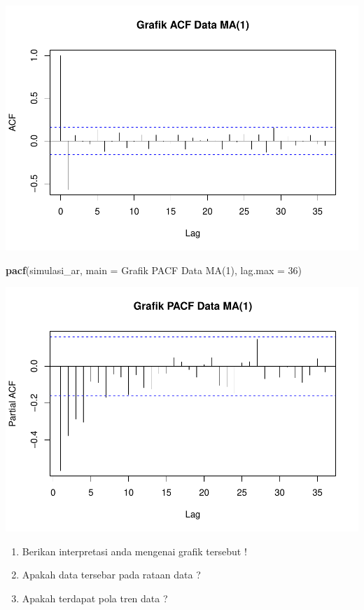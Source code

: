 \documentclass[
]{book}
\newenvironment{Shaded}{\begin{snugshade}}{\end{snugshade}}
\newcommand{\AttributeTok}[1]{\textcolor[rgb]{0.13,0.29,0.53}{#1}}
\newcommand{\DecValTok}[1]{\textcolor[rgb]{0.00,0.00,0.81}{#1}}
\newcommand{\FunctionTok}[1]{\textcolor[rgb]{0.13,0.29,0.53}{\textbf{#1}}}
\newcommand{\NormalTok}[1]{#1}
\newcommand{\StringTok}[1]{\textcolor[rgb]{0.31,0.60,0.02}{#1}}
\begin{document}
\begin{center}\includegraphics{_main_files/figure-latex/Model MA-2} \end{center}

\begin{Shaded}
\begin{Highlighting}[]
\FunctionTok{pacf}\NormalTok{(simulasi\_ar, }\AttributeTok{main =} \StringTok{\textquotesingle{}Grafik PACF Data MA(1)\textquotesingle{}}\NormalTok{, }
  \AttributeTok{lag.max =} \DecValTok{36}\NormalTok{)}
\end{Highlighting}
\end{Shaded}

\begin{center}\includegraphics{_main_files/figure-latex/Model MA-3} \end{center}
\begin{jp}{}{}
\begin{enumerate}
\item Berikan interpretasi anda mengenai grafik tersebut !  
\item Apakah data tersebar pada rataan data ?  
\item Apakah terdapat pola tren data ?
\end{enumerate}
\end{jp}
\end{document}

